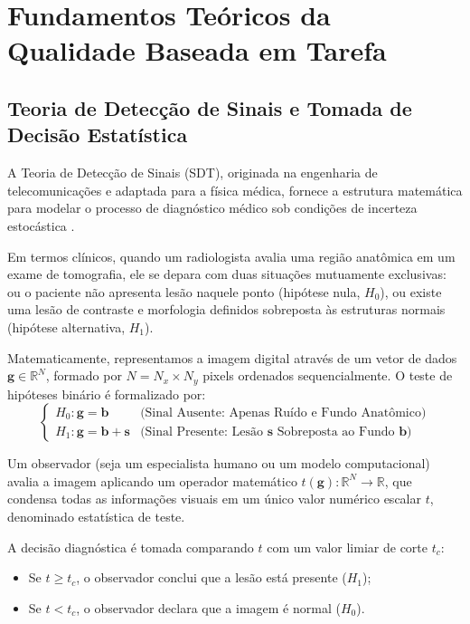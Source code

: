 \chapter{Fundamentos Teóricos da Qualidade Baseada em Tarefa}
\label{chap:fundamentacao}

\section{Teoria de Detecção de Sinais e Tomada de Decisão Estatística}
\label{sec:sdt}

A Teoria de Detecção de Sinais (SDT), originada na engenharia de telecomunicações e adaptada para a física médica, fornece a estrutura matemática para modelar o processo de diagnóstico médico sob condições de incerteza estocástica \cite{peterson1954, lusted1968, metz1986, barrett_myers_2004}.

Em termos clínicos, quando um radiologista avalia uma região anatômica em um exame de tomografia, ele se depara com duas situações mutuamente exclusivas: ou o paciente não apresenta lesão naquele ponto (hipótese nula, $H_0$), ou existe uma lesão de contraste e morfologia definidos sobreposta às estruturas normais (hipótese alternativa, $H_1$).

Matematicamente, representamos a imagem digital através de um vetor de dados $\mathbf{g} \in \mathbb{R}^N$, formado por $N = N_x \times N_y$ pixels ordenados sequencialmente. O teste de hipóteses binário é formalizado por:
\begin{equation}
  \begin{cases}
    H_0 : \mathbf{g} = \mathbf{b} & \text{(Sinal Ausente: Apenas Ruído e Fundo Anatômico)} \\
    H_1 : \mathbf{g} = \mathbf{b} + \mathbf{s} & \text{(Sinal Presente: Lesão } \mathbf{s} \text{ Sobreposta ao Fundo } \mathbf{b}\text{)}
  \end{cases}
  \label{eq:hipoteses_sdt}
\end{equation}

Um observador (seja um especialista humano ou um modelo computacional) avalia a imagem aplicando um operador matemático $t(\mathbf{g}): \mathbb{R}^N \to \mathbb{R}$, que condensa todas as informações visuais em um único valor numérico escalar $t$, denominado estatística de teste.

A decisão diagnóstica é tomada comparando $t$ com um valor limiar de corte $t_c$:
\begin{itemize}
  \item Se $t \ge t_c$, o observador conclui que a lesão está presente ($H_1$);
  \item Se $t < t_c$, o observador declara que a imagem é normal ($H_0$).
\end{itemize}

